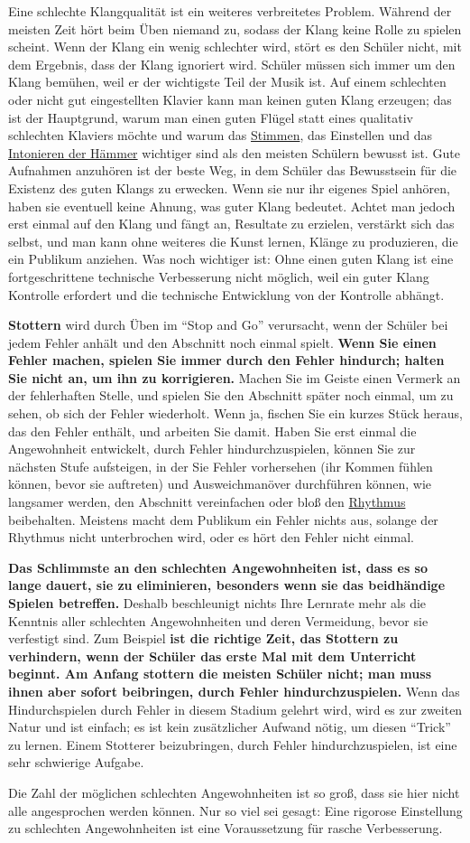 Eine schlechte Klangqualität ist ein weiteres verbreitetes Problem.
Während der meisten Zeit hört beim Üben niemand zu, sodass der Klang keine Rolle zu spielen scheint.
Wenn der Klang ein wenig schlechter wird, stört es den Schüler nicht, mit dem Ergebnis, dass der Klang ignoriert wird.
Schüler müssen sich immer um den Klang bemühen, weil er der wichtigste Teil der Musik ist.
Auf einem schlechten oder nicht gut eingestellten Klavier kann man keinen guten Klang erzeugen;
das ist der Hauptgrund, warum man einen guten Flügel statt eines qualitativ schlechten Klaviers möchte und warum das \hyperref[c2_1]{Stimmen}, das Einstellen und das \hyperref[c2_7_hamm]{Intonieren der Hämmer} wichtiger sind als den meisten Schülern bewusst ist.
Gute Aufnahmen anzuhören ist der beste Weg, in dem Schüler das Bewusstsein für die Existenz des guten Klangs zu erwecken.
Wenn sie nur ihr eigenes Spiel anhören, haben sie eventuell keine Ahnung, was guter Klang bedeutet.
Achtet man jedoch erst einmal auf den Klang und fängt an, Resultate zu erzielen, verstärkt sich das selbst, und man kann ohne weiteres die Kunst lernen, Klänge zu produzieren, die ein Publikum anziehen.
Was noch wichtiger ist: Ohne einen guten Klang ist eine fortgeschrittene technische Verbesserung nicht möglich, weil ein guter Klang Kontrolle erfordert und die technische Entwicklung von der Kontrolle abhängt.

\textbf{Stottern} wird durch Üben im \enquote{Stop and Go} verursacht, wenn der Schüler bei jedem Fehler anhält und den Abschnitt noch einmal spielt.
\textbf{Wenn Sie einen Fehler machen, spielen Sie immer durch den Fehler hindurch; halten Sie nicht an, um ihn zu korrigieren.}
Machen Sie im Geiste einen Vermerk an der fehlerhaften Stelle, und spielen Sie den Abschnitt später noch einmal, um zu sehen, ob sich der Fehler wiederholt.
Wenn ja, fischen Sie ein kurzes Stück heraus, das den Fehler enthält, und arbeiten Sie damit.
Haben Sie erst einmal die Angewohnheit entwickelt, durch Fehler hindurchzuspielen, können Sie zur nächsten Stufe aufsteigen, in der Sie Fehler vorhersehen (ihr Kommen fühlen können, bevor sie auftreten) und Ausweichmanöver durchführen können, wie langsamer werden, den Abschnitt vereinfachen oder bloß den \hyperref[c1iii1b]{Rhythmus} beibehalten.
Meistens macht dem Publikum ein Fehler nichts aus, solange der Rhythmus nicht unterbrochen wird, oder es hört den Fehler nicht einmal.

\textbf{Das Schlimmste an den schlechten Angewohnheiten ist, dass es so lange dauert, sie zu eliminieren, besonders wenn sie das beidhändige Spielen betreffen.}
Deshalb beschleunigt nichts Ihre Lernrate mehr als die Kenntnis aller schlechten Angewohnheiten und deren Vermeidung, bevor sie verfestigt sind.
Zum Beispiel \textbf{ist die richtige Zeit, das Stottern zu verhindern, wenn der Schüler das erste Mal mit dem Unterricht beginnt.
Am Anfang stottern die meisten Schüler nicht;
man muss ihnen aber sofort beibringen, durch Fehler hindurchzuspielen.}
Wenn das Hindurchspielen durch Fehler in diesem Stadium gelehrt wird, wird es zur zweiten Natur und ist einfach;
es ist kein zusätzlicher Aufwand nötig, um diesen \enquote{Trick} zu lernen.
Einem Stotterer beizubringen, durch Fehler hindurchzuspielen, ist eine sehr schwierige Aufgabe.

Die Zahl der möglichen schlechten Angewohnheiten ist so groß, dass sie hier nicht alle angesprochen werden können.
Nur so viel sei gesagt: Eine rigorose Einstellung zu schlechten Angewohnheiten ist eine Voraussetzung für rasche Verbesserung.



